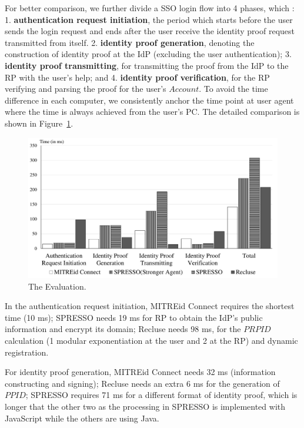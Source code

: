 For better comparison, we further divide a SSO login flow into 4 phases, which : 1. \textbf{authentication request initiation}, the period which starts before the user sends the login request and ends after the user receive the identity proof request transmitted from itself. 
2. \textbf{identity proof generation}, denoting the construction of identity proof at the IdP (excluding the user authentication); 3. \textbf{identity proof transmitting}, for transmitting the proof from the IdP to the RP with the user's help; and 4. \textbf{identity proof verification}, for the RP  verifying and parsing the proof for the user's $Account$. To avoid the time difference in each computer, we consistently anchor the time point at user agent where the time is always achieved from the user's PC. The detailed comparison is shown in Figure~\ref{fig:evaluation}.



\begin{figure}
  \centering
  \includegraphics[width=\linewidth]{fig/evaluation2.pdf}
  \caption{The Evaluation.}
  \label{fig:evaluation}
\end{figure}
In the authentication request initiation, MITREid Connect requires the shortest time (10 ms); SPRESSO needs 19 ms for RP to obtain the IdP's public information and encrypt its domain; Recluse needs 98 ms, for the $PRPID$ calculation (1 modular exponentiation at the user and 2 at the RP) and dynamic registration.

For identity proof generation, MITREid Connect needs 32 ms (information constructing and signing); Recluse needs an extra 6 ms for the generation of $PPID$;  SPRESSO requires 71 ms for a different format of identity proof, which is longer that the other two as the processing in SPRESSO is implemented with JavaScript while the others are using Java.

